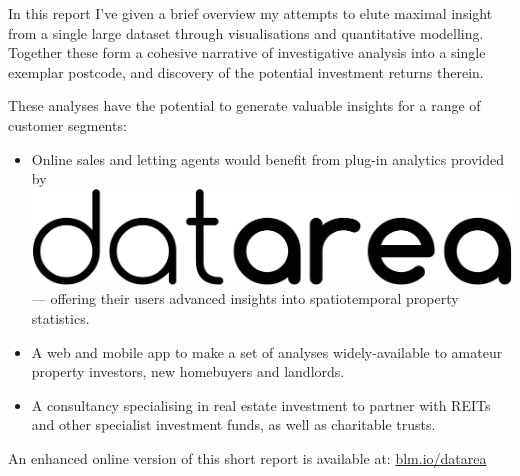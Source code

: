 \documentclass[
10pt, %
a4paper, %
oneside, %
headinclude,footinclude, %
BCOR5mm, %
]{scrartcl}
\newcommand*{\logo}{\includegraphics[scale=.04]{Figures/logotext.png}}
\begin{document}
In this report I've given a brief overview my attempts to elute
maximal insight from a single large dataset through visualisations and
quantitative modelling. Together these form a cohesive narrative of
investigative analysis into a single exemplar postcode, and discovery
of the potential investment returns therein.

These analyses have the potential to generate valuable insights for a range of
customer segments:
\begin{itemize}

\item Online sales and letting agents would benefit from
plug-in analytics provided by \logo \hspace{.1em} --- offering their
users advanced insights into spatiotemporal property statistics.

\item A web and mobile app to make a set of analyses widely-available
  to amateur property investors, new homebuyers and landlords.

\item A consultancy specialising in real estate investment to partner
  with REITs and other specialist investment funds, as well as
  charitable trusts.
\end{itemize}

\vspace{1em}
\begin{flushright} {\small An enhanced online version of this short
    report is available at:
    \leavevmode\href{http://blm.io/datarea}{blm.io/datarea}}
\end{flushright}

\end{document}

